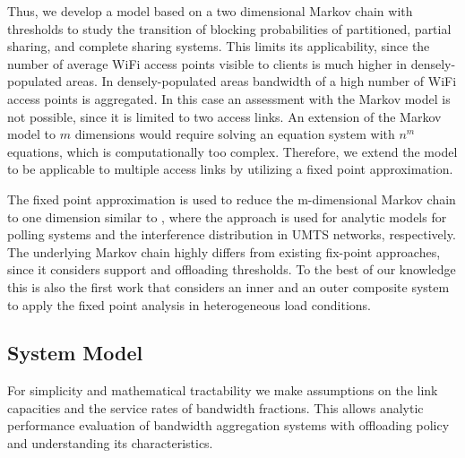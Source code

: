 Thus, we develop a model based on a two dimensional Markov chain with thresholds to study the transition of blocking probabilities of partitioned, partial sharing, and complete sharing systems.
This limits its applicability, since the number of average WiFi access points visible to clients is much higher in densely-populated areas.
In densely-populated areas bandwidth of a high number of WiFi access points is aggregated. In this case an assessment with the Markov model  is not possible, since it is limited to two access links. An extension of the Markov model to $m$ dimensions would require solving an equation system with $n^m$ equations, which is computationally too complex.
Therefore, we extend the model to be applicable to multiple access links by utilizing a fixed point approximation.

The fixed point approximation is used to reduce the m-dimensional Markov chain to one dimension similar to \cite{trangia1992polling, staehle2002approximation}, where the approach is used for analytic models for polling systems and the interference distribution in UMTS networks, respectively.
The underlying Markov chain highly differs from existing fix-point approaches, since it considers support and offloading thresholds.
To the best of our knowledge this is also the first work that considers an inner and an outer composite system to apply the fixed point analysis in heterogeneous load conditions.


\subsection{System Model}


For simplicity and mathematical tractability we make assumptions on the link capacities and the service rates of bandwidth fractions. This allows analytic performance evaluation of bandwidth aggregation systems with offloading policy and understanding its characteristics.


